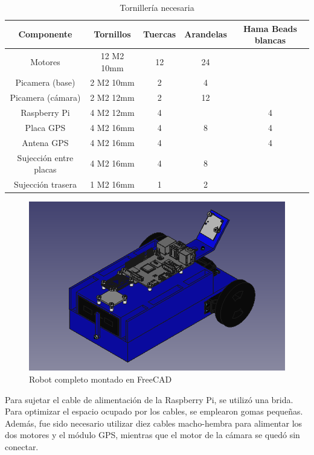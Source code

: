 \begin{table}[H]
	\begin{center}
		\begin{tabular}{|c|c|c|c|c|}
			\hline
			Componente & Tornillos & Tuercas & Arandelas & Hama Beads blancas\\
			\hline
			Motores & 12 M2 10mm & 12 & 24 &\\
			\hline
			Picamera (base) & 2 M2 10mm & 2 & 4 &\\
			\hline
			Picamera (cámara) & 2 M2 12mm & 2 & 12 &\\
			\hline
			Raspberry Pi & 4 M2 12mm & 4 & & 4\\
			\hline
			Placa GPS & 4 M2 16mm & 4 & 8 & 4\\
			\hline
			Antena GPS & 4 M2 16mm & 4 & & 4\\
			\hline
			Sujección entre placas & 4 M2 16mm & 4 & 8 &\\
			\hline
			Sujección trasera & 1 M2 16mm & 1 & 2 &\\
			\hline
		\end{tabular}
		\caption{Tornillería necesaria}
		\label{cuadro:tornillos}
	\end{center}
\end{table}

\begin{figure} [h!]
	\begin{center}
		\includegraphics[width=12cm]{figs/cap5/completo3.png}
	\end{center}
	\caption{Robot completo montado en FreeCAD} 
	\label{fig:robotfreecad}
\end{figure}


Para sujetar el cable de alimentación de la Raspberry Pi, se utilizó una brida. Para optimizar el espacio ocupado por los cables, se emplearon gomas pequeñas. Además, fue sido necesario utilizar diez cables macho-hembra para alimentar los dos motores y el módulo GPS, mientras que el motor de la cámara se quedó sin conectar.

